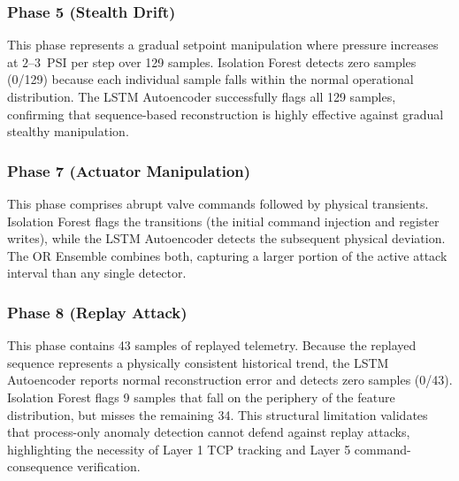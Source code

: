 \documentclass[journal,twoside,web]{ieeecolor}
\begin{document}
\subsubsection{Phase 5 (Stealth Drift)}
This phase represents a gradual setpoint manipulation where pressure increases at $2$--$3$~PSI per step over 129 samples. Isolation Forest detects zero samples (0/129) because each individual sample falls within the normal operational distribution. The LSTM Autoencoder successfully flags all 129 samples, confirming that sequence-based reconstruction is highly effective against gradual stealthy manipulation.

\subsubsection{Phase 7 (Actuator Manipulation)}
This phase comprises abrupt valve commands followed by physical transients. Isolation Forest flags the transitions (the initial command injection and register writes), while the LSTM Autoencoder detects the subsequent physical deviation. The OR Ensemble combines both, capturing a larger portion of the active attack interval than any single detector.

\subsubsection{Phase 8 (Replay Attack)}
This phase contains 43 samples of replayed telemetry. Because the replayed sequence represents a physically consistent historical trend, the LSTM Autoencoder reports normal reconstruction error and detects zero samples (0/43). Isolation Forest flags 9 samples that fall on the periphery of the feature distribution, but misses the remaining 34. This structural limitation validates that process-only anomaly detection cannot defend against replay attacks, highlighting the necessity of Layer 1 TCP tracking and Layer 5 command-consequence verification.
\end{document}

